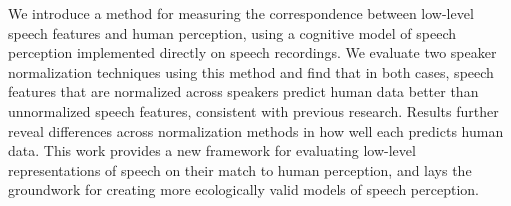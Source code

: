 We introduce a method for measuring the correspondence between low-level speech features and human perception, using a cognitive model of speech perception implemented directly on speech recordings.  We evaluate two speaker normalization techniques using this method and find that in both cases, speech features that are normalized across speakers predict human data better than unnormalized speech features, consistent with previous research.  Results further reveal differences across normalization methods in how well each predicts human data.  This work provides a new framework for evaluating low-level representations of speech on their match to human perception, and lays the groundwork for creating more ecologically valid models of speech perception.
